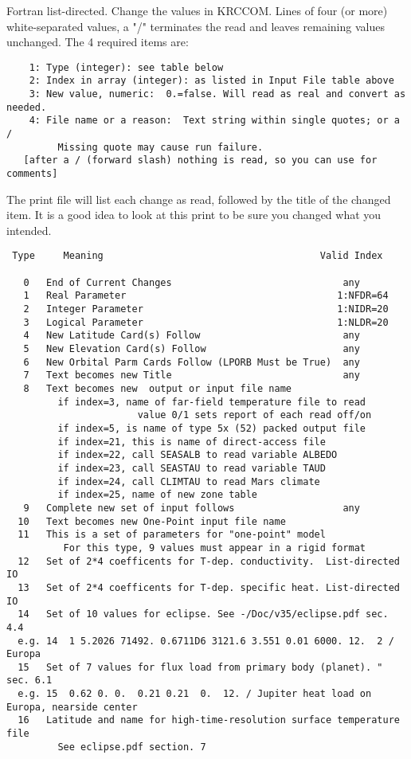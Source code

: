 \documentclass{article}
\begin{document}
Fortran list-directed.  Change the values in KRCCOM.  Lines of four (or more) 
white-separated values, a "/" terminates the read and leaves remaining values
unchanged.  The 4 required items are:
\vspace{-3.mm} 
\begin{verbatim}
    1: Type (integer): see table below
    2: Index in array (integer): as listed in Input File table above
    3: New value, numeric:  0.=false. Will read as real and convert as needed.
    4: File name or a reason:  Text string within single quotes; or a /
         Missing quote may cause run failure.
   [after a / (forward slash) nothing is read, so you can use for comments]
\end{verbatim}
The print file will list each change as read, followed by the title of the
changed item. It is a good idea to look at this print to be sure you changed
what you intended.
\vspace{-3.mm} 
\begin{verbatim}
 Type     Meaning                                      Valid Index

   0   End of Current Changes                              any
   1   Real Parameter                                     1:NFDR=64
   2   Integer Parameter                                  1:NIDR=20
   3   Logical Parameter                                  1:NLDR=20
   4   New Latitude Card(s) Follow                         any
   5   New Elevation Card(s) Follow                        any
   6   New Orbital Parm Cards Follow (LPORB Must be True)  any
   7   Text becomes new Title                              any
   8   Text becomes new  output or input file name
         if index=3, name of far-field temperature file to read
                       value 0/1 sets report of each read off/on
         if index=5, is name of type 5x (52) packed output file
         if index=21, this is name of direct-access file
         if index=22, call SEASALB to read variable ALBEDO
         if index=23, call SEASTAU to read variable TAUD
         if index=24, call CLIMTAU to read Mars climate
         if index=25, name of new zone table
   9   Complete new set of input follows                   any
  10   Text becomes new One-Point input file name
  11   This is a set of parameters for "one-point" model 
          For this type, 9 values must appear in a rigid format
  12   Set of 2*4 coefficents for T-dep. conductivity.  List-directed IO
  13   Set of 2*4 coefficents for T-dep. specific heat. List-directed IO 
  14   Set of 10 values for eclipse. See -/Doc/v35/eclipse.pdf sec. 4.4 
  e.g. 14  1 5.2026 71492. 0.6711D6 3121.6 3.551 0.01 6000. 12.  2 / Europa
  15   Set of 7 values for flux load from primary body (planet). " sec. 6.1
  e.g. 15  0.62 0. 0.  0.21 0.21  0.  12. / Jupiter heat load on Europa, nearside center
  16   Latitude and name for high-time-resolution surface temperature file
         See eclipse.pdf section. 7


\end{verbatim}
\end{document}
